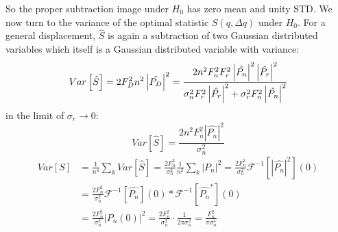 \documentclass[a4paper]{article}
\newcommand{\rb}[1]{\left(#1\right)}
\newcommand{\sqb}[1]{\left[#1\right]}
\newcommand{\abs}[1]{\left|#1\right|}
\begin{document}
	So the proper subtraction image under $H_0$ has zero mean and unity STD.
	We now turn to the variance of the optimal statistic $S(q,\Delta q)$ under $H_0$. For a general displacement, $\hat{S}$ is again a subtraction of two Gaussian distributed variables which itself is a Gaussian distributed variable with variance:
	\begin{equation}
	Var\sqb{\hat{S}}=2F_D^2 n^2 \abs{\hat{P_D}}^2=\frac{2n^2 F_n^2 F_r^2 \abs{\hat{P_n}}^2\abs{\hat{P_r}}^2}{\sigma^2_n F_r^2 \abs{\hat{P_r}}^2 + \sigma^2_r F_n^2 \abs{\hat{P_n}}^2}\\ 
	\end{equation}  
    in the limit of $\sigma_r \rightarrow 0$:
    \begin{equation}
    Var\sqb{\hat{S}}=\frac{2n^2F^2_n\abs{\hat{P_n}}^2}{\sigma^2_n}
    \end{equation}
	\begin{equation}
	\begin{split}
	Var\sqb{S} & =\frac{1}{n^4} \sum_k Var\sqb{\hat{S}}=\frac{2F_n^2}{\sigma_n^2}\frac{1}{n^2}\sum_k\abs{P_n}^2=\frac{2F_n^2}{\sigma_n^2}\mathcal{F}^{-1}\sqb{\abs{\hat{P_n}}^2}(0)\\
	& = \frac{2F_n^2}{\sigma_n^2}\mathcal{F}^{-1}\sqb{\hat{P_n}}(0)*\mathcal{F}^{-1}\sqb{\hat{P_n}^*}(0)\\
	& = \frac{2F_n^2}{\sigma_n^2}\abs{P_n\rb{0}}^2 = \frac{2F_n^2}{\sigma_n^2}\cdot \frac{1}{2\pi \sigma_n^2} = \boxed{\frac{F_n^2}{\pi\sigma_n^4}}\\
	\end{split}
	\end{equation}
\end{document}
